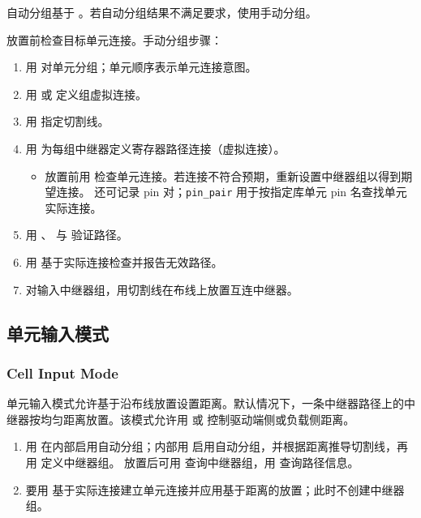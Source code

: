 自动分组基于 。若自动分组结果不满足要求，使用手动分组。

放置前检查目标单元连接。手动分组步骤：
\begin{enumerate}
  \item 用  对单元分组；单元顺序表示单元连接意图。
  \item 用  或  定义组虚拟连接。
  \item 用  指定切割线。
  \item 用  为每组中继器定义寄存器路径连接（虚拟连接）。
  \begin{itemize}
    \item 放置前用   检查单元连接。若连接不符合预期，重新设置中继器组以得到期望连接。 还可记录 pin 对；\texttt{pin\_pair} 用于按指定库单元 pin 名查找单元实际连接。
  \end{itemize}
  \item 用 、 与  验证路径。
  \item 用   基于实际连接检查并报告无效路径。
  \item 对输入中继器组，用切割线在布线上放置互连中继器。
\end{enumerate}

\subsection{单元输入模式}
\subsubsection*{Cell Input Mode}

单元输入模式允许基于沿布线放置设置距离。默认情况下，一条中继器路径上的中继器按均匀距离放置。该模式允许用  或  控制驱动端侧或负载侧距离。

\begin{enumerate}
  \item 用    在内部启用自动分组；内部用   启用自动分组，并根据距离推导切割线，再用    定义中继器组。
  放置后可用  查询中继器组，用  查询路径信息。
  \item 要用   基于实际连接建立单元连接并应用基于距离的放置；此时不创建中继器组。
\end{enumerate}

